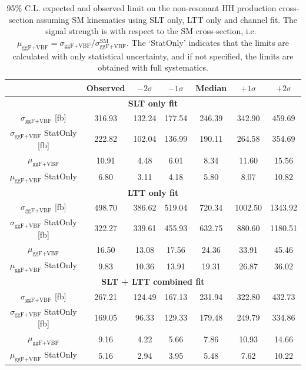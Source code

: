 \begin{table}[htbp]
\centering
\begin{tabular}{|c|c|c|c|c|c|c|}
\hline
& Observed & $-2\sigma$ & $-1\sigma$ & Median & $+1\sigma$ & $+2\sigma$\\
\hline
\multicolumn{7}{|c|}{\textbf{SLT only fit}} \\
\hline
$\sigma_\text{ggF+VBF}$ [fb] & 316.93  &   132.24  &   177.54   &  246.39  &   342.90  &   459.69 \\ 
\hline
$\sigma_\text{ggF+VBF}$ StatOnly [fb] & 222.82  &   102.04  &   136.99  &  190.11  &   264.58  &   354.69 \\ 
\hline
$\mu_\text{ggF+VBF}$ & 10.91   &    4.48   &    6.01   &    8.34  &    11.60  &    15.56 \\ 
\hline
$\mu_\text{ggF+VBF}$ StatOnly & 6.80   &    3.11   &    4.18   &    5.80   &    8.07   &   10.82 \\ 
\hline
\multicolumn{7}{|c|}{\textbf{LTT only fit}} \\
\hline
$\sigma_\text{ggF+VBF}$ [fb] & 498.70  &   386.62  &   519.04  &  720.34  &  1002.50  &  1343.92 \\ 
\hline
$\sigma_\text{ggF+VBF}$ StatOnly [fb] & 322.27  &   339.61  &   455.93  &  632.75  &   880.60  &  1180.51 \\ 
\hline
$\mu_\text{ggF+VBF}$ & 16.50   &   13.08   &   17.56   &   24.36   &   33.91  &    45.46 \\ 
\hline
$\mu_\text{ggF+VBF}$ StatOnly & 9.83   &   10.36  &    13.91   &   19.31   &   26.87  &    36.02 \\ 
\hline
\multicolumn{7}{|c|}{\textbf{SLT + LTT combined fit}} \\
\hline
$\sigma_\text{ggF+VBF}$ [fb] & 267.21  &   124.49  &   167.13  &  231.94  &   322.80  &   432.73 \\ 
\hline
$\sigma_\text{ggF+VBF}$ StatOnly [fb] & 169.05  &    96.33  &   129.33  &  179.48  &   249.79  &   334.86 \\ 
\hline
$\mu_\text{ggF+VBF}$ & 9.16   &    4.22   &    5.66   &    7.86   &    10.93   &   14.66 \\ 
\hline
$\mu_\text{ggF+VBF}$ StatOnly & 5.16   &    2.94   &    3.95   &    5.48   &    7.62  &    10.22 \\ 
\hline
\end{tabular}
\caption{95\% C.L. expected and observed limit on the non-resonant HH production cross-section 
assuming SM kinematics using SLT only, LTT only and \lephad channel fit.
The signal strength is with respect to the 
SM cross-section, i.e.\ 
$\mu_\text{ggF+VBF}=\sigma_\text{ggF+VBF}/\sigma_\text{ggF+VBF}^\text{SM}$.
The `StatOnly' indicates that the limits are calculated with only statistical uncertainty,
and if not specified, the limits are obtained with full systematics.
}
\label{sec:fit:tab:SMLepHadLimits}
\end{table}
